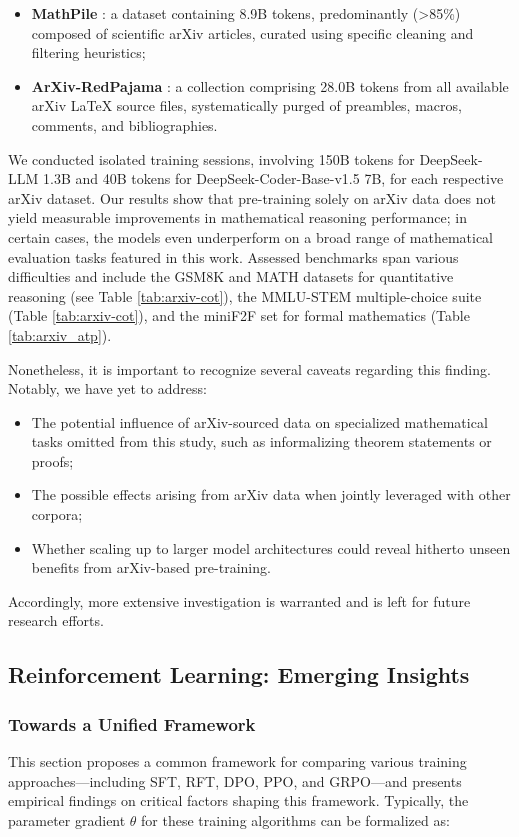 \begin{itemize}[topsep=0pt]
    \item \textbf{MathPile} \citep{mathpile}: a dataset containing 8.9B tokens, predominantly (>85\%) composed of scientific arXiv articles, curated using specific cleaning and filtering heuristics;
    \item \textbf{ArXiv-RedPajama} \citep{redpajama}: a collection comprising 28.0B tokens from all available arXiv LaTeX source files, systematically purged of preambles, macros, comments, and bibliographies.
\end{itemize}

We conducted isolated training sessions, involving 150B tokens for DeepSeek-LLM 1.3B and 40B tokens for DeepSeek-Coder-Base-v1.5 7B, for each respective arXiv dataset. Our results show that pre-training solely on arXiv data does not yield measurable improvements in mathematical reasoning performance; in certain cases, the models even underperform on a broad range of mathematical evaluation tasks featured in this work. Assessed benchmarks span various difficulties and include the GSM8K and MATH datasets for quantitative reasoning (see Table \ref{tab:arxiv-cot}), the MMLU-STEM multiple-choice suite (Table \ref{tab:arxiv-cot}), and the miniF2F set for formal mathematics (Table \ref{tab:arxiv_atp}).

Nonetheless, it is important to recognize several caveats regarding this finding. Notably, we have yet to address:

\begin{itemize}[topsep=0pt]
    \item The potential influence of arXiv-sourced data on specialized mathematical tasks omitted from this study, such as informalizing theorem statements or proofs;
    \item The possible effects arising from arXiv data when jointly leveraged with other corpora;
    \item Whether scaling up to larger model architectures could reveal hitherto unseen benefits from arXiv-based pre-training.
\end{itemize}

Accordingly, more extensive investigation is warranted and is left for future research efforts.

\subsection{Reinforcement Learning: Emerging Insights}
\subsubsection{Towards a Unified Framework} This section proposes a common framework for comparing various training approaches—including SFT, RFT, DPO, PPO, and GRPO—and presents empirical findings on critical factors shaping this framework. Typically, the parameter gradient $\theta$ for these training algorithms can be formalized as:


